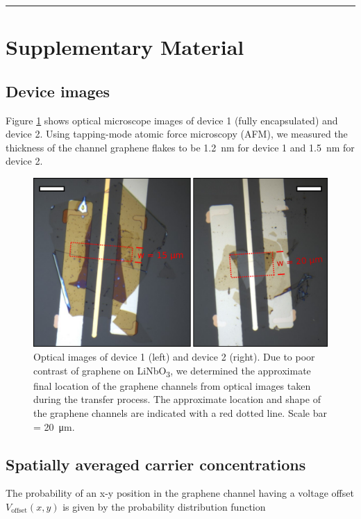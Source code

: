 \documentclass[double,12pt,1in,seploa]{beavtex}
\let\Oldsection\section
\renewcommand{\section}{\FloatBarrier\Oldsection}
\let\Oldsubsection\subsection
\renewcommand{\subsection}{\FloatBarrier\Oldsubsection}
\begin{document}
\noindent\rule{\textwidth}{1pt}

\clearpage
\section{Supplementary Material}

\subsection{Device images}
Figure \ref{AECP Figure S1} shows optical microscope images of device 1 (fully encapsulated) and device 2. Using tapping-mode atomic force microscopy (AFM), we measured the thickness of the channel graphene flakes to be \SI{1.2}{\nano\meter} for device 1 and \SI{1.5}{\nano\meter} for device 2.

\begin{figure}
    \includegraphics[width = 1\textwidth]{Figure S1, device images.png}
    \caption{Optical images of device 1 (left) and device 2 (right). Due to poor contrast of graphene on LiNbO\textsubscript{3}, we determined the approximate final location of the graphene channels from optical images taken during the transfer process. The approximate location and shape of the graphene channels are indicated with a red dotted line. Scale bar = \SI{20}{\micro\meter}.}
    \label{AECP Figure S1}
\end{figure}

\subsection{Spatially averaged carrier concentrations}
The probability of an x-y position in the graphene channel having a voltage offset
$V_{\mathrm{offset}}(x,y)$ is given by the probability distribution function
\end{document}
